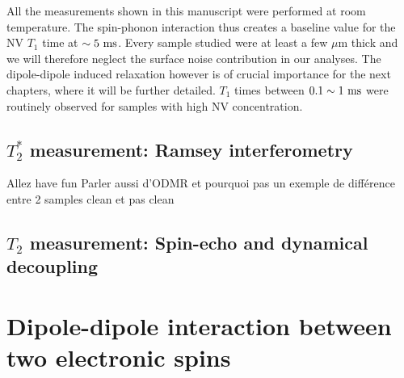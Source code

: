 \documentclass[a4paper,11pt]{report}
\begin{document}
All the measurements shown in this manuscript were performed at room temperature. The spin-phonon interaction thus creates a baseline value for the NV $T_1$ time at $\sim 5\ \rm ms$. Every sample studied were at least a few $\mu$m thick and we will therefore neglect the surface noise contribution in our analyses. The dipole-dipole induced relaxation however is of crucial importance for the next chapters, where it will be further detailed. $T_1$ times between $0.1 \sim 1\ \rm ms$ were routinely observed for samples with high NV concentration.

\subsection{$T_2^*$ measurement: Ramsey interferometry}
Allez have fun
Parler aussi d'ODMR et pourquoi pas un exemple de différence entre 2 samples clean et pas clean

\subsection{$T_2$ measurement: Spin-echo and dynamical decoupling}

\section{Dipole-dipole interaction between two electronic spins}

\printbibliography
\end{document}
